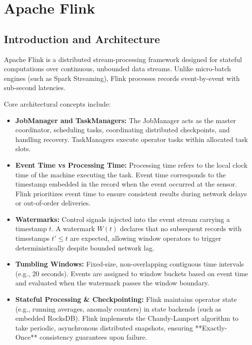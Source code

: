 \documentclass[12pt,a4paper]{report}
\begin{document}
\section{Apache Flink}
\subsection{Introduction and Architecture}
Apache Flink is a distributed stream-processing framework designed for stateful computations over continuous, unbounded data streams. Unlike micro-batch engines (such as Spark Streaming), Flink processes records event-by-event with sub-second latencies.

Core architectural concepts include:
\begin{itemize}
    \item \textbf{JobManager and TaskManagers:} The JobManager acts as the master coordinator, scheduling tasks, coordinating distributed checkpoints, and handling recovery. TaskManagers execute operator tasks within allocated task slots.
    \item \textbf{Event Time vs Processing Time:} Processing time refers to the local clock time of the machine executing the task. Event time corresponds to the timestamp embedded in the record when the event occurred at the sensor. Flink prioritizes event time to ensure consistent results during network delays or out-of-order deliveries.
    \item \textbf{Watermarks:} Control signals injected into the event stream carrying a timestamp $t$. A watermark $W(t)$ declares that no subsequent records with timestamps $t' \le t$ are expected, allowing window operators to trigger deterministically despite bounded network lag.
    \item \textbf{Tumbling Windows:} Fixed-size, non-overlapping contiguous time intervals (e.g., 20 seconds). Events are assigned to window buckets based on event time and evaluated when the watermark passes the window boundary.
    \item \textbf{Stateful Processing \& Checkpointing:} Flink maintains operator state (e.g., running averages, anomaly counters) in state backends (such as embedded RocksDB). Flink implements the Chandy-Lamport algorithm to take periodic, asynchronous distributed snapshots, ensuring **Exactly-Once** consistency guarantees upon failure.
\end{itemize}
\end{document}
